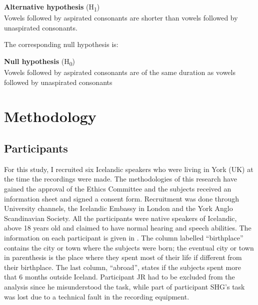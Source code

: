 \documentclass[11pt,a4paper,openany]{memoir}\usepackage[]{graphicx}\usepackage[]{color}
\begin{document}
\begin{exe}
\ex\label{h1} \textbf{Alternative hypothesis} (H\textsubscript{1}) \\
Vowels followed by aspirated consonants are shorter than vowels followed by unaspirated consonants.
\end{exe}

The corresponding null hypothesis is:

\begin{exe}
\ex\label{h0} \textbf{Null hypothesis} (H\textsubscript{0}) \\
Vowels followed by aspirated consonants are of the same duration as vowels followed by unaspirated consonants
\end{exe}








\chapter{Methodology}

\section{Participants}
For this study, I recruited six Icelandic speakers who were living in York (UK) at the time the recordings were made.
The methodologies of this research have gained the approval of the Ethics Committee and the subjects received an information sheet and signed a consent form.
Recruitment was done through University channels, the Icelandic Embassy in London and the York Anglo Scandinavian Society.
All the participants were native speakers of Icelandic, above 18 years old and claimed to have normal hearing and speech abilities.
The information on each participant is given in .
The column labelled ``birthplace'' contains the city or town where the subjects were born; the eventual city or town in parenthesis is the place where they spent most of their life if different from their birthplace.
The last column, ``abroad'', states if the subjects spent more that 6 months outside Iceland.
Participant JR had to be excluded from the analysis since he misunderstood the task, while part of participant SHG's task was lost due to a technical fault in the recording equipment.


\end{document}

